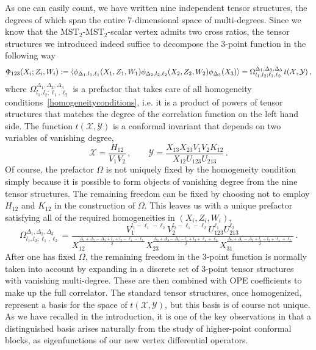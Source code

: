\documentclass{article}
\begin{document}
As one can easily count, we have written nine independent tensor structures, the degrees of which span the entire $7$-dimensional space of multi-degrees. Since we know that the 
MST$_2$-MST$_2$-scalar vertex admits two cross ratios, the tensor structures we introduced 
indeed suffice to decompose the 3-point function in the following way 
\begin{equation}
    \Phi_{123}(X_i;Z_i,W_i) := \expval{\phi_{\Delta_1,l_1,\ell_1}(X_1,Z_1,W_1)
    \phi_{\Delta_2,l_2,\ell_2}(X_2,Z_2,W_2)\phi_{\Delta_3}(X_3)}=
    \Omega^{\Delta_1,\Delta_2,\Delta_3}_{l_1,l_2;\ell_1,\ell_2} \, t(\mathcal{X},\mathcal{Y})\,,
    \label{eq:threepointtwoMST}
\end{equation}
where $\Omega^{\Delta_1,\Delta_2,\Delta_3}_{l_1,l_2;\ell_1,\ell_2}$ is a prefactor that 
takes care of all homogeneity conditions~\eqref{homogeneityconditions}, i.e. it is a
product of powers of tensor structures that matches the degree of the correlation function 
on the left hand side. The function $t(\mathcal{X},\mathcal{Y})$ is a conformal invariant 
that depends on two variables of vanishing degree, 
\begin{equation}
    \mathcal{X}=\frac{H_{12}}{V_1 V_2}\,, \qquad \mathcal{Y}=\frac{X_{13} X_{23} 
    V_1 V_2 K_{12}}{X_{12}U_{123}U_{213}}\,.
    \label{eq:threepointcrossratios}
\end{equation}
Of course, the prefactor $\Omega$ is not uniquely fixed by the homogeneity condition simply 
because it is possible to form objects of vanishing degree from the nine tensor structures. 
The remaining freedom can be fixed by choosing not to employ $H_{12}$ and 
$K_{12}$ in the construction of $\Omega$. This leaves us with a unique prefactor satisfying 
all of the required homogeneities in 
$(X_i,Z_i,W_i)$, 
\begin{equation}
    \Omega^{\Delta_1,\Delta_2,\Delta_3}_{l_1,l_2;\ell_1,\ell_2}=
    \frac{V_1^{l_1-\ell_1-\ell_2}V_2^{l_2-\ell_1-\ell_2}U_{123}^{\ell_1}U_{213}^{\ell_2}}
    {X_{12}^{\frac{\Delta_1+\Delta_2-\Delta_3+l_1+l_2-\ell_1-\ell_2}{2}}
    X_{23}^{\frac{\Delta_2+\Delta_3-\Delta_1-l_1+l_2+\ell_1+\ell_2}{2}}
    X_{31}^{\frac{\Delta_3+\Delta_1-\Delta_2+l_1-l_2+\ell_1+\ell_2}{2}}}\,.
    \label{prefactor2MST}
\end{equation}
After one has fixed $\Omega$, the remaining freedom in the 3-point function is normally 
taken into account by expanding in a discrete set of 3-point tensor structures with 
vanishing multi-degree. These are then combined with OPE coefficients to make up the full 
correlator. The standard tensor structures, once homogenized, represent a basis for the 
space of $t(\mathcal{X},\mathcal{Y})$, but this basis is of course not unique. As 
we have recalled in the introduction, it is one of the key observations in 
\cite{Buric:2020dyz} that a distinguished basis arises naturally from the study of 
higher-point conformal blocks, as eigenfunctions of our new vertex differential 
operators.%
\medskip%
\end{document}
